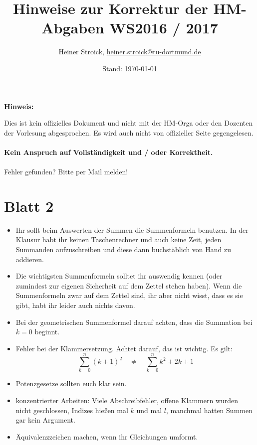 \documentclass[11pt, a4paper]{article}
\title{Hinweise zur Korrektur der HM\RM{1}-Abgaben WS2016 / 2017}
\author{Heiner Stroick, \href{mailto:heiner.stroick@tu-dortmund.de}{heiner.stroick@tu-dortmund.de}}
\date{Stand: \today}
\begin{document}
\maketitle

\begin{mdframed}[linecolor=red]
\begin{center}
{\footnotesize \textbf{Hinweis:} 

Dies ist kein offizielles Dokument und nicht mit der HM-Orga oder den Dozenten der Vorlesung abgesprochen. Es wird auch nicht von offizieller Seite gegengelesen.\\
~\\
\textcolor[rgb]{1,0,0}{\textbf{Kein Anspruch auf Vollständigkeit und / oder Korrektheit.}}\\
~\\
\textcolor[rgb]{0,0,1}{Fehler gefunden? Bitte per Mail melden!}}
\end{center}
\end{mdframed}


\section*{Blatt 2}
\begin{itemize}

\item Ihr sollt beim Auswerten der Summen die Summenformeln benutzen. In der Klausur habt ihr keinen Taschenrechner und auch keine Zeit, jeden Summanden aufzuschreiben und diese dann buchstäblich von Hand zu addieren. 

\item Die wichtigsten Summenformeln solltet ihr auswendig kennen (oder zumindest zur eigenen Sicherheit auf dem Zettel stehen haben). Wenn die Summenformeln zwar auf dem Zettel sind, ihr aber nicht wisst, dass es sie gibt, habt ihr leider auch nichts davon.

\item Bei der geometrischen Summenformel darauf achten, dass die Summation bei $k = 0$ beginnt.

\item Fehler bei der Klammersetzung. Achtet darauf, das ist wichtig. Es gilt:
\begin{equation*}
\sum_{k=0}^n (k+1)^2 \quad \neq \quad \sum_{k=0}^n k^2 + 2k + 1
\end{equation*}

\item  Potenzgesetze sollten euch klar sein.

\item konzentrierter Arbeiten: Viele Abschreibfehler, offene Klammern wurden nicht geschlossen, Indizes hießen mal $k$ und mal $l$, manchmal hatten Summen gar kein Argument.

\item Äquivalenzzeichen machen, wenn ihr Gleichungen umformt. 

\end{itemize}
\end{document}
